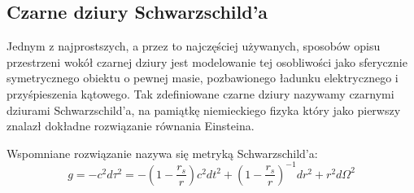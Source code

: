 \subsection{Czarne dziury Schwarzschild'a}

Jednym z najprostszych, a przez to najczęściej używanych, sposobów opisu przestrzeni wokół czarnej dziury jest modelowanie tej osobliwości jako sferycznie symetrycznego obiektu o pewnej masie, pozbawionego ładunku elektrycznego i przyśpieszenia kątowego. Tak zdefiniowane czarne dziury nazywamy czarnymi dziurami Schwarzschild'a, na pamiątkę niemieckiego fizyka który jako pierwszy znalazł dokładne rozwiązanie równania Einsteina.

Wspomniane rozwiązanie nazywa się metryką Schwarzschild'a:
$$g=-c^2d\tau^2=- \left( 1-\frac{r_s}{r}  \right) c^2dt^2 + \left(1-\frac{r_s}{r} \right)^{-1}dr^2 +r^2d\Omega^2 $$
